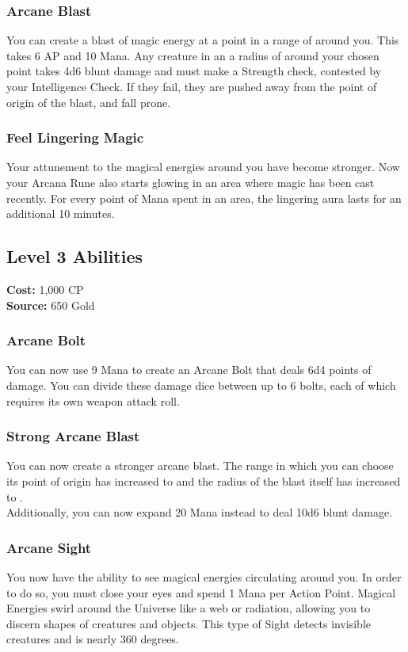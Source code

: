 \subsubsection{Arcane Blast}
You can create a blast of magic energy at a point in a range of  around you. This takes 6 AP and 10 Mana. Any creature in an a radius of  around your chosen point takes 4d6 blunt damage and must make a Strength check, contested by your Intelligence Check. If they fail, they are pushed  away from the point of origin of the blast, and fall prone.

\subsubsection{Feel Lingering Magic}
Your attunement to the magical energies around you have become stronger. Now your Arcana Rune also starts glowing in an area where magic has been cast recently. For every point of Mana spent in an area, the lingering aura lasts for an additional 10 minutes.

\subsection{Level 3 Abilities}
\textbf{Cost:} 1,000 CP\\
\textbf{Source:} 650 Gold
\subsubsection{Arcane Bolt}
You can now use 9 Mana to create an Arcane Bolt that deals 6d4 points of damage. You can divide these damage dice between up to 6 bolts, each of which requires its own weapon attack roll.

\subsubsection{Strong Arcane Blast}
You can now create a stronger arcane blast. The range in which you can choose its point of origin has increased to  and the radius of the blast itself has increased to .\\
Additionally, you can now expand 20 Mana instead to deal 10d6 blunt damage.

\subsubsection{Arcane Sight}
You now have the ability to see magical energies circulating around you. In order to do so, you must close your eyes and spend 1 Mana per Action Point. Magical Energies swirl around the Universe like a web or radiation, allowing you to discern shapes of creatures and objects. This type of Sight detects invisible creatures and is nearly 360 degrees.
\onecolumn